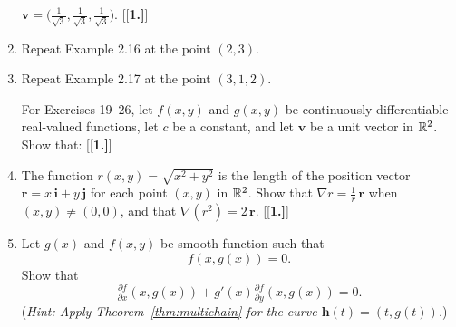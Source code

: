 \begin{enumerate}[\bfseries 1.]
 $\mathbf{v} = \biggl( \frac{1}{\sqrt{3}},\frac{1}{\sqrt{3}},\frac{1}{\sqrt{3}} \biggr)$.
 [{[\bfseries 1.]}]
  \item Repeat Example 2.16 at the point $(2,3)$.
  \item Repeat Example 2.17 at the point $(3,1,2)$.
\par\noindent For Exercises 19--26, let $f(x,y)$ and $g(x,y)$ be continuously differentiable
real-valued functions, let $c$ be a constant, and let $\mathbf{v}$ be a unit vector in $\mathbb{R}^{2}$. Show that:
[{[\bfseries 1.]}]
 \item The function $r(x,y) = \sqrt{x^2 + y^2}$ is the length of the position vector
  $\mathbf{r}=x\,\mathbf{i} + y\,\mathbf{j}$ for each point $(x,y)$ in $\mathbb{R}^{2}$. 
  Show that $\nabla r = \tfrac{1}{r}\,\mathbf{r}$ when $(x,y) \ne (0,0)$, and that $\nabla (r^2 ) = 2\,\mathbf{r}$.
[{[\bfseries 1.]}]
\item Let $g(x)$ and $f(x,y)$ be smooth function such that
\[f(x,g(x))=0.\]
Show that 
\[\tfrac{\partial f}{\partial x}(x,g(x))+
g'(x)\tfrac{\partial f}{\partial y}(x,g(x))=0.\]
(\emph{Hint: Apply Theorem~\ref{thm:multichain} for the curve $\mathbf{h}(t)=(t,g(t))$.})

\end{enumerate}

